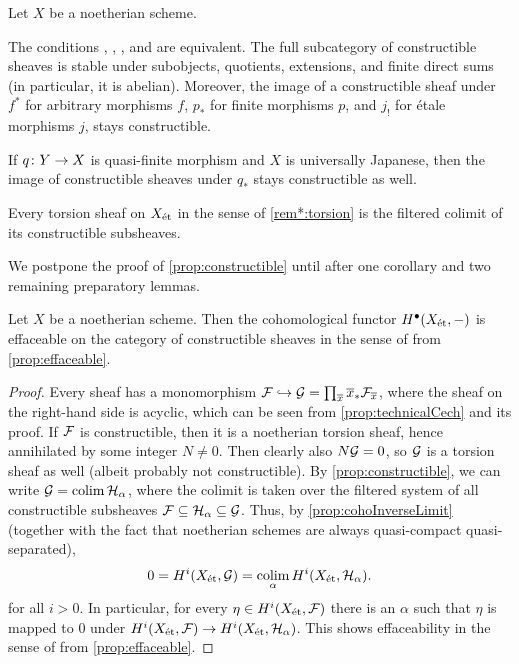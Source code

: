 \begin{prop}\label{prop:constructible}
	Let $X$ be a noetherian scheme.
	\begin{alphanumerate}
		\item The conditions , , , and  are equivalent. The full subcategory of constructible sheaves is stable under subobjects, quotients, extensions, and finite direct sums (in particular, it is abelian). Moreover, the image of a constructible sheaf under $f^*$ for arbitrary morphisms $f$, $p_*$ for finite morphisms $p$, and $j_!$ for étale morphisms $j$, stays constructible.
		\item If $q\colon Y\morphism X$ is quasi-finite morphism and $X$ is universally Japanese, then the image of constructible sheaves under $q_*$ stays constructible as well.
		\item Every torsion sheaf on $X_{\mathrm{\acute{e}t}}$ in the sense of \cref{rem*:torsion} is the filtered colimit of its constructible subsheaves.
	\end{alphanumerate}
\end{prop}
We postpone the proof of \cref{prop:constructible} until after one corollary and two remaining preparatory lemmas.
\begin{cor}\label{cor:constructibleEffaceable}
	Let $X$ be a noetherian scheme. Then the cohomological functor $H^\bullet(X_{\mathrm{\acute{e}t}},-)$ is effaceable on the category of constructible sheaves in the sense of  from \cref{prop:effaceable}.
\end{cor}
\begin{proof}
	Every sheaf has a monomorphism $\Ff\monomorphism \Gg= \prod_{\ov{x}}\ov{x}_*\Ff_{\ov{x}}$, where the sheaf on the right-hand side is acyclic, which can be seen from \cref{prop:technicalCech} and its proof. If $\mathcal{F}$ is constructible, then it is a noetherian torsion sheaf, hence annihilated by some integer $N\neq 0$. Then clearly also $N\mathcal{G}=0$, so $\mathcal{G}$ is a torsion sheaf as well (albeit probably not constructible). By \cref{prop:constructible}, we can write $\mathcal{G}=\operatorname*{colim} \mathcal{H}_\alpha$, where the colimit is taken over the filtered system of all constructible subsheaves $\mathcal{F}\subseteq \mathcal{H}_\alpha\subseteq \mathcal{G}$. Thus, by \cref{prop:cohoInverseLimit} (together with the fact that noetherian schemes are always quasi-compact quasi-separated),
	\begin{equation*}
		0=H^i(X_{\mathrm{\acute{e}t}},\mathcal{G})=\operatorname*{colim}_\alpha H^i(X_{\mathrm{\acute{e}t}},\mathcal{H}_\alpha).
	\end{equation*}
	for all $i>0$. In particular, for every $\eta\in H^i(X_{\mathrm{\acute{e}t}},\mathcal{F})$ there is an $\alpha$ such that $\eta$ is mapped to $0$ under $H^i(X_\et,\Ff)\morphism H^i(X_\et,\Hh_\alpha)$. This shows effaceability in the sense of  from \cref{prop:effaceable}.
\end{proof}

